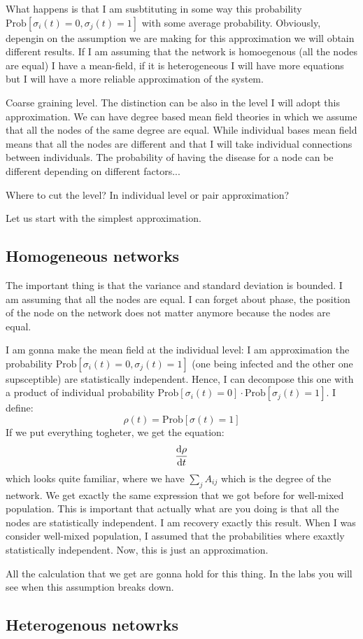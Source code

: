 \documentclass[../main/main.tex]{subfiles}
\begin{document}
What happens is that I am susbtituting in some way this probability \( \text{Prob} [\sigma _i (t) = 0, \sigma _j (t ) =1 ]  \) with some average probability.
Obviously, depengin on the assumption we are making for this approximation we will obtain different results. If I am assuming that the network is homoegenous (all the nodes are equal) I have a mean-field, if it is heterogeneous I will have more equations but I will have a more reliable approximation of the system.

Coarse graining level.
The distinction can be also in the level I will adopt this approximation. We can have degree based mean field theories in which we assume that all the nodes of the same degree are equal. While individual bases mean field means that all the nodes are different and that I will take individual connections between individuals. The probability of having the disease for a node can be different depending on different factors...

Where to cut the level? In individual level or pair approximation?

Let us start with the simplest approximation.

\subsection{Homogeneous networks}
The important thing is that the variance and standard deviation is bounded. I am assuming that all the nodes are equal. I can forget about phase, the position of the node on the network does not matter anymore because the nodes are equal.

I am gonna make the mean field at the individual level: I am approximation the probability \( \text{Prob} [\sigma _i (t) = 0, \sigma _j (t ) =1 ] \) (one being infected and the other one supsceptible) are statistically independent. Hence, I can decompose this one with a product of individual probability \( \text{Prob} [\sigma _i (t) = 0] \cdot \text{Prob} [\sigma _j (t ) =1 ] \).
I define:
\begin{equation*}
  \rho (t) = \text{Prob} [\sigma (t)=1]
\end{equation*}
If we put everything togheter, we get the equation:
\begin{equation*}
  \dv{\rho }{t}
\end{equation*}
which looks quite familiar, where we have \( \sum_{j}^{} A_{ij}   \) which is the degree of the network.
We get exactly the same expression that we got before for well-mixed population. This is important that actually what are you doing is that all the nodes are statistically independent. I am recovery exactly this result. When I was consider well-mixed population, I assumed that the probabilities where exaxtly statistically independent. Now, this is just an approximation.

All the calculation that we get are gonna hold for this thing. In the labs you will see when this assumption breaks down.

\subsection{Heterogenous netowrks}
\end{document}
